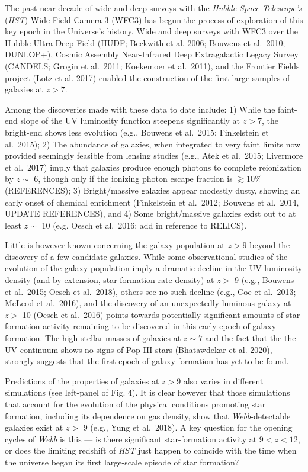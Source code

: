 \documentclass[12pt]{article}
\begin{document}
The past near-decade of wide and deep surveys with the {\it Hubble Space Telescope’s} ({\it HST}) Wide Field Camera 3 (WFC3) has begun the process of exploration of this key epoch in the Universe’s history.  Wide and deep surveys with WFC3 over the Hubble Ultra Deep Field (HUDF; Beckwith et al. 2006; Bouwens et al.\ 2010; DUNLOP+), Cosmic Assembly Near-Infrared Deep Extragalactic Legacy Survey (CANDELS; Grogin et al.\ 2011; Koekemoer et al.\ 2011), and the Frontier Fields project (Lotz et al. 2017) enabled the construction of the first large samples of galaxies at $z>7$.  

Among the discoveries made with these data to date include: 1) While the faint-end slope of the UV luminosity function steepens significantly at $z>7$, the bright-end shows less evolution (e.g., Bouwens et al.\ 2015; Finkelstein et al.\ 2015); 2) The abundance of galaxies, when integrated to very faint limits now provided seemingly feasible from lensing studies (e.g., Atek et al.\ 2015; Livermore et al.\ 2017) imply that galaxies produce enough photons to complete reionization by $z\sim$ 6, though only if the ionizing photon escape fraction is $\gtrsim$10\% (REFERENCES); 3) Bright/massive galaxies appear modestly dusty, showing an early onset of chemical enrichment (Finkelstein et al.\ 2012; Bouwens et al.\ 2014, UPDATE REFERENCES), and 4) Some bright/massive galaxies exist out to at least $z \sim$ 10 (e.g. Oesch et al.\ 2016; add in reference to RELICS).

Little is however known concerning the galaxy population at $z > 9$ beyond the discovery of a few candidate galaxies.  While some observational studies of the evolution of the galaxy population imply a dramatic decline in the UV luminosity density (and by extension, star-formation rate density) at $z >$ 9 (e.g., Bouwens et al.\ 2015; Oesch et al.\ 2018), others see no such decline (e.g., Coe et al.\ 2013; McLeod et al.\ 2016), and the discovery of an unexpectedly luminous galaxy at $z >$ 10 (Oesch et al.\ 2016) points towards potentially significant amounts of star-formation activity remaining to be discovered in this early epoch of galaxy formation.    The high stellar masses of galaxies at $z \sim 7$ and the fact that the the UV continuum shows no signs of Pop III stars (Bhatawdekar et al. 2020), strongly suggests that the first epoch of galaxy formation has yet to be found.

Predictions of the properties of galaxies at $z > 9$ also varies in different simulations (see left-panel of Fig. 4). It is clear however that those simulations that account for the evolution of the physical conditions promoting star formation, including its dependence on gas density, show that {\it Webb}-detectable galaxies exist  at $z >$ 9 (e.g., Yung et al.\ 2018).  A key question for the opening cycles of {\it Webb} is this — is there significant star-formation activity at  $9<z<12$, or does the limiting redshift of {\it HST} just happen to coincide with the time when the universe began its first large-scale episode of star formation?
\end{document}
